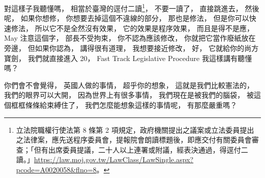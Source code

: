 \hypertarget{w06:cue:875}{}對這樣子我聽懂嗎，
\hypertarget{w06:cue:876}{}相當於臺灣的逕付二讀\footnote{立法院職權行使法第 8 條第 2 項規定，政府機關提出之議案或立法委員提出之法律案，應先送程序委員會，提報院會朗讀標題後，即應交付有關委員會審查；「但有出席委員提議，二十人以上連署或附議，經表決通過，得逕付二讀。」\url{https://law.moj.gov.tw/LawClass/LawSingle.aspx?pcode=A0020058&flno=8}。}，
\hypertarget{w06:cue:877}{}不要一讀了，
\hypertarget{w06:cue:878}{}直接跳進去，
\hypertarget{w06:cue:879}{}然後呢，
\hypertarget{w06:cue:880}{}如果你想修，
\hypertarget{w06:cue:881}{}你想要去掉這個不違線的部分，
\hypertarget{w06:cue:882}{}那也是修法，
\hypertarget{w06:cue:883}{}但是你可以快速修法，
\hypertarget{w06:cue:884}{}所以它不是全然沒有效果，
\hypertarget{w06:cue:885}{}它的效果是程序效果，
\hypertarget{w06:cue:886}{}而且是得不是應，
\hypertarget{w06:cue:887}{}May
\hypertarget{w06:cue:888}{}注意這個字，
\hypertarget{w06:cue:889}{}部長不受拘束，
\hypertarget{w06:cue:890}{}你不認為應該修改，
\hypertarget{w06:cue:891}{}你就把它當作廢紙放在旁邊，
\hypertarget{w06:cue:892}{}但如果你認為，
\hypertarget{w06:cue:893}{}講得很有道理，
\hypertarget{w06:cue:894}{}我想要接近修改，
\hypertarget{w06:cue:895}{}好，
\hypertarget{w06:cue:896}{}它就給你的尚方寶劍，
\hypertarget{w06:cue:897}{}我們就直接進入 20，
\hypertarget{w06:cue:898}{}Fast Track Legislative Procedure
\hypertarget{w06:cue:899}{}我這樣講有聽懂嗎？

\hypertarget{w06:cue:900}{}你們會不會覺得，
\hypertarget{w06:cue:901}{}英國人做的事情，
\hypertarget{w06:cue:902}{}超乎你的想象，
\hypertarget{w06:cue:903}{}這就是我們比較憲法的，
\hypertarget{w06:cue:904}{}我們的眼界可以大開，
\hypertarget{w06:cue:905}{}因為世界上有很多事情，
\hypertarget{w06:cue:906}{}我們現在是被我們的腦袋，
\hypertarget{w06:cue:907}{}被這個框框條條給束縛住了，
\hypertarget{w06:cue:908}{}我們怎麼能想象這樣的事情呢，
\hypertarget{w06:cue:909}{}有那麼嚴重嗎？

